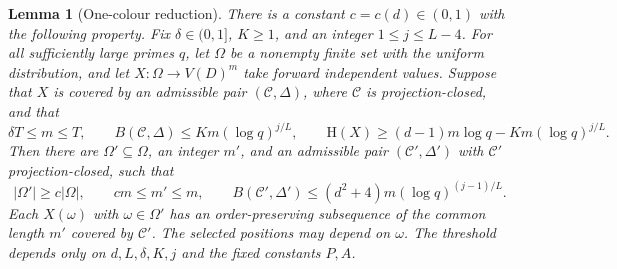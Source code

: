 \documentclass[11pt,a4paper]{article}
\numberwithin{equation}{section}
\newtheorem{lemma}[theorem]{Lemma}
\newcommand{\HH}{\mathrm H}
\newcommand{\cC}{\mathcal C}
\begin{document}
\begin{lemma}[One-colour reduction]\label{lem:reduction}
There is a constant $c=c(d)\in(0,1)$ with the following
property. Fix $\delta\in(0,1]$, $K\ge1$, and an integer
$1\le j\le L-4$.
For all sufficiently large primes $q$, let $\Omega$ be a
nonempty finite set with the uniform distribution, and let
$X:\Omega\to V(D)^m$ take forward independent values.
Suppose that $X$ is covered by an admissible pair $(\cC,\Delta)$,
where $\cC$ is projection-closed, and that
\begin{equation}\label{eq:reduction-input}
 \delta T\le m\le T,\qquad
 B(\cC,\Delta)\le Km(\log q)^{j/L},\qquad
 \HH(X)\ge(d-1)m\log q-Km(\log q)^{j/L}.
\end{equation}
Then there are $\Omega'\subseteq\Omega$, an integer $m'$, and
an admissible pair $(\cC',\Delta')$ with $\cC'$ projection-closed,
such that
\begin{equation}\label{eq:reduction-output}
 |\Omega'|\ge c|\Omega|,\qquad
 cm\le m'\le m,\qquad
 B(\cC',\Delta')\le(d^2+4)m(\log q)^{(j-1)/L}.
\end{equation}
Each $X(\omega)$ with $\omega\in\Omega'$ has an order-preserving
subsequence of the common length $m'$ covered by $\cC'$.
The selected positions may depend on $\omega$.
The threshold depends only on $d,L,\delta,K,j$ and the fixed
constants $P,A$.
\end{lemma}
\end{document}
